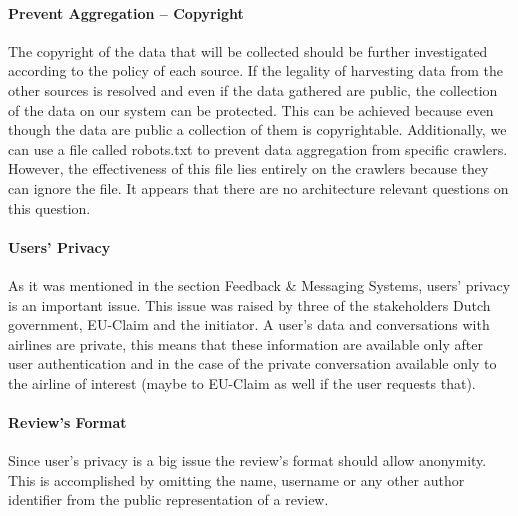 \documentclass{article}
\begin{document}
\paragraph{Prevent Aggregation – Copyright} The copyright of the data that will be collected should be further investigated according to the policy of each source. If the legality of 
harvesting data from the other sources is resolved and even if the data gathered are public, the collection of the data on our system can be protected. This can be achieved because 
even though the data are public a collection of them is copyrightable. Additionally, we can use a file called robots.txt to prevent data aggregation from specific crawlers. However, 
the effectiveness of this file lies entirely on the crawlers because they can ignore the file. It appears that there are no architecture relevant questions on this question.

\paragraph{Users' Privacy} As it was mentioned in the section Feedback \& Messaging Systems, users' privacy is an important issue. This issue was raised by three of the stakeholders 
Dutch government, EU-Claim and the initiator. A user's data and conversations with airlines are private, this means that these information are available only after user authentication 
and in the case of the private conversation available only to the airline of interest (maybe to EU-Claim as well if the user requests that). 

\paragraph{Review's Format} Since user's privacy is a big issue the review's format should allow anonymity. This is accomplished by omitting the name, username or any other author 
identifier from the public representation of a review.



\end{document}

